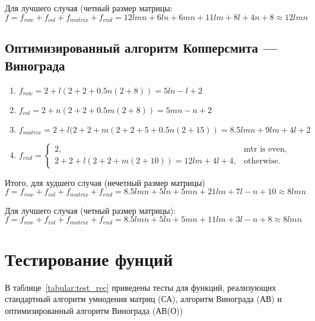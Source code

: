 Для лучшего случая (четный размер матрицы: $f = f_{row} + f_{col} + f_{matrix} + f_{end} = 12lmn + 6ln + 6mn + 11lm + 8l + 4n + 8 \approx 12lmn$

\subsection{Оптимизированный алгоритм Копперсмита — Винограда}
\begin{enumerate}
	\item $f_{row} = 2 + l(2 + 2 + 0.5n(2 + 8)) = 5ln - l + 2$
	\item $f_{col} = 2 + n(2 + 2 + 0.5m(2 + 8)) = 5mn - n + 2$
	\item $f_{matrix} = 2 + l(2 + 2 + m(2 + 2 + 5 + 0.5n(2 + 15)) = 8.5lmn + 9lm + 4l + 2$
	\item $f_{end} = \begin{cases}
	2, & \text{mtr is even,}\\
	2 + 2 + l(2 + 2 + m(2 + 10)) = 12lm + 4l + 4, & \text{otherwise.}
	\end{cases}$
\end{enumerate}

Итого, для худшего случая (нечетный размер матрицы) $f = f_{row} + f_{col} + f_{matrix} + f_{end} = 8.5lmn + 5ln + 5mn + 21lm + 7l - n + 10 \approx 8lmn$

Для лучшего случая (четный размер матрицы): $f = f_{row} + f_{col} + f_{matrix} + f_{end} = 8.5lmn + 5ln + 5mn + 11lm + 3l - n + 8 \approx 8lmn$

\section{Тестирование фунций}

В таблице~\ref{tabular:test_rec} приведены тесты для функций, реализующих стандартный алгоритм умнодения матриц (СА), алгоритм Винограда (АВ) и оптимизированный алгоритм Винограда (АВ(О))

